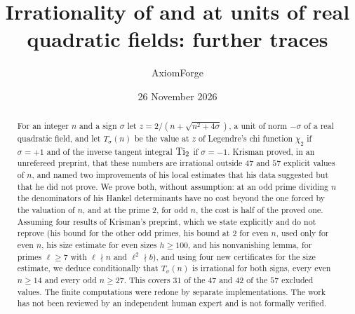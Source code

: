\documentclass[11pt]{amsart}
\title[Legendre chi and inverse tangent values at quadratic units]%
{\texorpdfstring{Irrationality of \titlechi{} and \titleti{} at units of real quadratic fields: further traces}%
{Irrationality of chi2 and Ti2 at units of real quadratic fields: further traces}}
\author{AxiomForge}
\date{26 November 2026}
\begin{document}
\begin{abstract}
For an integer $n$ and a sign $\sigma$ let $z=2/(n+\sqrt{n^2+4\sigma})$, a unit of norm
$-\sigma$ of a real quadratic field, and let $T_\sigma(n)$ be the value at $z$ of Legendre's chi
function $\chi_2$ if $\sigma=+1$ and of the inverse tangent integral $\operatorname{Ti}_2$ if $\sigma=-1$.
Krisman proved, in an unrefereed preprint, that these numbers are irrational outside $47$ and
$57$ explicit values of $n$, and named two improvements of his local estimates that his data
suggested but that he did not prove. We prove both, without assumption: at an odd prime dividing $n$ the
denominators of his Hankel determinants have no cost beyond the one forced by the valuation of
$n$, and at the prime $2$, for odd $n$, the cost is half of the proved one. Assuming four results
of Krisman's preprint, which we state explicitly and do not reprove (his bound for the other odd
primes, his bound at $2$ for even $n$, used only for even $n$, his size estimate for even sizes $h\ge100$,
and his nonvanishing lemma, for primes $\ell\ge7$ with $\ell\nmid n$ and $\ell^2\nmid b$), and using
four new certificates for the size estimate, we deduce conditionally that $T_\sigma(n)$ is irrational for both
signs, every even $n\ge14$ and every odd $n\ge27$. This covers $31$ of the $47$ and $42$ of the
$57$ excluded values. The finite computations were redone by separate implementations. The work
has not been reviewed by an independent human expert and is not formally verified.
\end{abstract}

\affrontmatter










\appendix



\clearpage



\clearpage


\end{document}
